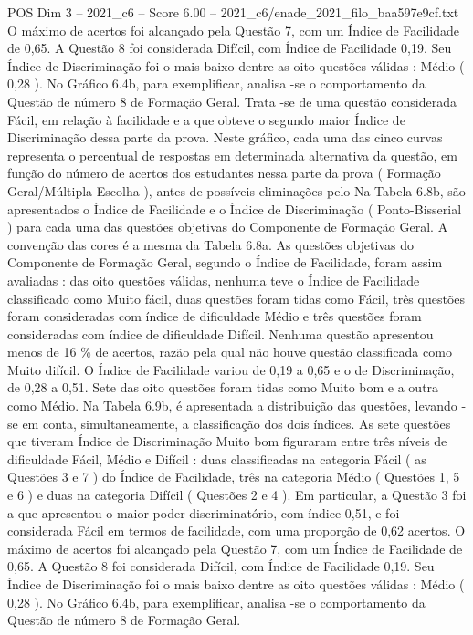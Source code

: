 \begin{textsample}{POS Dim 3 – 2021\_c6 – Score 6.00 – 2021\_c6/enade\_2021\_filo\_baa597e9cf.txt}
O máximo de acertos foi alcançado pela Questão 7, com um Índice de Facilidade de 0,65.
A Questão 8 foi considerada Difícil, com Índice de Facilidade 0,19.
Seu Índice de Discriminação foi o mais baixo dentre as oito questões válidas : Médio ( 0,28 ).
No Gráfico 6.4b, para exemplificar, analisa -se o comportamento da Questão de número 8 de Formação Geral.
Trata -se de uma questão considerada Fácil, em relação à facilidade e a que obteve o segundo maior Índice de Discriminação dessa parte da prova.
Neste gráfico, cada uma das cinco curvas representa o percentual de respostas em determinada alternativa da questão, em função do número de acertos dos estudantes nessa parte da prova ( Formação Geral/Múltipla Escolha ), antes de possíveis eliminações pelo Na Tabela 6.8b, são apresentados o Índice de Facilidade e o Índice de Discriminação ( Ponto-Bisserial ) para cada uma das questões objetivas do Componente de Formação Geral.
A convenção das cores é a mesma da Tabela 6.8a.
As questões objetivas do Componente de Formação Geral, segundo o Índice de Facilidade, foram assim avaliadas : das oito questões válidas, nenhuma teve o Índice de Facilidade classificado como Muito fácil, duas questões foram tidas como Fácil, três questões foram consideradas com índice de dificuldade Médio e três questões foram consideradas com índice de dificuldade Difícil.
Nenhuma questão apresentou menos de 16 \% de acertos, razão pela qual não houve questão classificada como Muito difícil.
O Índice de Facilidade variou de 0,19 a 0,65 e o de Discriminação, de 0,28 a 0,51.
Sete das oito questões foram tidas como Muito bom e a outra como Médio.
Na Tabela 6.9b, é apresentada a distribuição das questões, levando -se em conta, simultaneamente, a classificação dos dois índices.
As sete questões que tiveram Índice de Discriminação Muito bom figuraram entre três níveis de dificuldade Fácil, Médio e Difícil : duas classificadas na categoria Fácil ( as Questões 3 e 7 ) do Índice de Facilidade, três na categoria Médio ( Questões 1, 5 e 6 ) e duas na categoria Difícil ( Questões 2 e 4 ).
Em particular, a Questão 3 foi a que apresentou o maior poder discriminatório, com índice 0,51, e foi considerada Fácil em termos de facilidade, com uma proporção de 0,62 acertos.
O máximo de acertos foi alcançado pela Questão 7, com um Índice de Facilidade de 0,65.
A Questão 8 foi considerada Difícil, com Índice de Facilidade 0,19.
Seu Índice de Discriminação foi o mais baixo dentre as oito questões válidas : Médio ( 0,28 ).
No Gráfico 6.4b, para exemplificar, analisa -se o comportamento da Questão de número 8 de Formação Geral.

\end{textsample}
